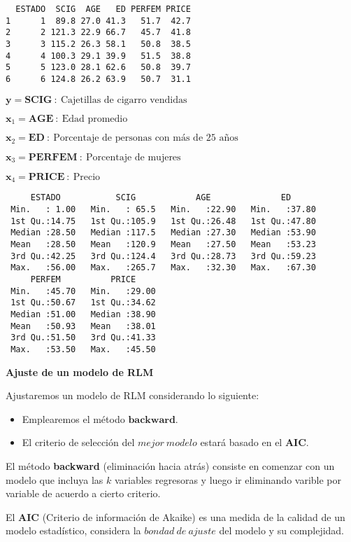 \documentclass[
  a4paper,
  oneside,
  openany]{book}
\begin{document}
\begin{verbatim}
  ESTADO  SCIG  AGE   ED PERFEM PRICE
1      1  89.8 27.0 41.3   51.7  42.7
2      2 121.3 22.9 66.7   45.7  41.8
3      3 115.2 26.3 58.1   50.8  38.5
4      4 100.3 29.1 39.9   51.5  38.8
5      5 123.0 28.1 62.6   50.8  39.7
6      6 124.8 26.2 63.9   50.7  31.1
\end{verbatim}

\(\textbf{y}=\textbf{SCIG} \ : \ \mbox{Cajetillas de cigarro vendidas}\)

\(\textbf{x}_1=\textbf{AGE} \ : \ \mbox{Edad promedio}\)

\(\textbf{x}_2=\textbf{ED} \ : \ \mbox{Porcentaje de personas con más de 25 años}\)

\(\textbf{x}_3=\textbf{PERFEM} \ : \ \mbox{Porcentaje de mujeres}\)

\(\textbf{x}_4=\textbf{PRICE} \ : \ \mbox{Precio}\)

\begin{verbatim}
     ESTADO           SCIG            AGE              ED       
 Min.   : 1.00   Min.   : 65.5   Min.   :22.90   Min.   :37.80  
 1st Qu.:14.75   1st Qu.:105.9   1st Qu.:26.48   1st Qu.:47.80  
 Median :28.50   Median :117.5   Median :27.30   Median :53.90  
 Mean   :28.50   Mean   :120.9   Mean   :27.50   Mean   :53.23  
 3rd Qu.:42.25   3rd Qu.:124.4   3rd Qu.:28.73   3rd Qu.:59.23  
 Max.   :56.00   Max.   :265.7   Max.   :32.30   Max.   :67.30  
     PERFEM          PRICE      
 Min.   :45.70   Min.   :29.00  
 1st Qu.:50.67   1st Qu.:34.62  
 Median :51.00   Median :38.90  
 Mean   :50.93   Mean   :38.01  
 3rd Qu.:51.50   3rd Qu.:41.33  
 Max.   :53.50   Max.   :45.50  
\end{verbatim}

\textbf{Ajuste de un modelo de RLM}

Ajustaremos un modelo de RLM considerando lo siguiente:

\begin{itemize}
\item
  Emplearemos el método \(\textbf{backward}.\)
\item
  El criterio de selección del \(mejor \ modelo\) estará basado en el \(\textbf{AIC}.\)
\end{itemize}

El método \textbf{backward} (eliminación hacia atrás) consiste en comenzar con un modelo que incluya las \(k\) variables regresoras y luego ir eliminando varible por variable de acuerdo a cierto criterio.

El \textbf{AIC} (Criterio de información de Akaike) es una medida de la calidad de un modelo estadístico, considera la \(bondad \ de \ ajuste\) del modelo y su complejidad.
\end{document}
